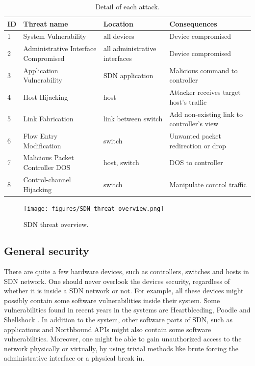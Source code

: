\begin{table}[H]
\centering
\caption{Detail of each attack.}
\begin{tabular}{|l|p{4cm}|p{3.2cm}|p{5cm}|}
\hline ID & Threat name	& Location & Consequences \\
\hline
\hline 1 & System Vulnerability & all devices & Device compromised\\
\hline 2 & Administrative Interface Compromised & all administrative interfaces & Device compromised \\
\hline 3 & Application Vulnerability & SDN application & Malicious command to controller \\
\hline 4 & Host Hijacking & host & Attacker receives target host's traffic \\
\hline 5 & Link Fabrication & link between switch & Add non-existing link to controller's view \\
\hline 6 & Flow Entry Modification & switch & Unwanted packet redirection or drop \\
\hline 7 & Malicious Packet Controller DOS  & host, switch & DOS to controller \\
\hline 8 & Control-channel Hijacking & switch & Manipulate control traffic \\
\hline 
\end{tabular}
\label{table:sdn_threats}
\end{table}

\begin{figure}[H]
\begin{center} 
\texttt{[image: figures/SDN\_threat\_overview.png]}
\end{center}
\caption{SDN threat overview.}
\label{SND_threat_overview}
\end{figure}


\subsection{General security}
There are quite a few hardware devices, such as controllers, switches and hosts in SDN network. One should never overlook the devices security, regardless of whether it is inside a SDN network or not. For example, all these devices might possibly contain some software vulnerabilities inside their system. Some vulnerabilities found in recent years in the systems are Heartbleeding, Poodle and Shellshock \cite{HB,POODLE,SHELLSHOCK}. In addition to the system, other software parts of SDN, such as applications and Northbound APIs might also contain some software vulnerabilities. Moreover, one might be able to gain unauthorized access to the network physically or virtually, by using trivial methods like brute forcing the administrative interface or a physical break in. 

